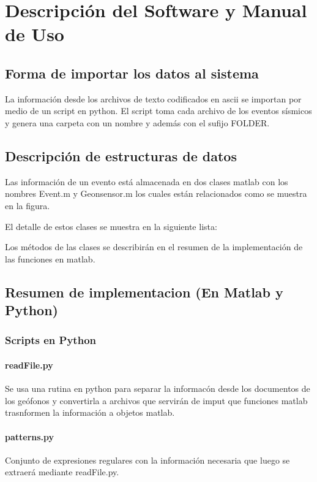 \section{Descripción del Software y Manual de Uso}

\subsection{Forma de importar los datos al sistema}
La información desde los archivos de texto codificados en ascii se importan por
medio de un script en python. El script toma cada archivo de los eventos
sísmicos y genera una carpeta con un nombre y además con el sufijo FOLDER.
 
\subsection{Descripción de estructuras de datos}
Las información de un evento está almacenada en dos clases matlab con los
nombres Event.m y Geonsensor.m los cuales están relacionados como se muestra
en la figura.



El detalle de estos clases se muestra en la siguiente lista:

Los métodos de las clases se describirán en el resumen de la implementación
de las funciones en matlab.

\subsection{Resumen de implementacion (En Matlab y Python)}

\subsubsection{Scripts en Python}
\paragraph{readFile.py}
Se usa una rutina en python para separar la informacón desde los documentos
de los geófonos y convertirla a archivos que servirán de imput que funciones
matlab trasnformen la información a objetos matlab.
\paragraph{patterns.py}
Conjunto de expresiones regulares con la información necesaria que luego se
extraerá mediante readFile.py.

